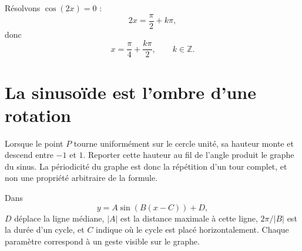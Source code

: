 \documentclass[12pt,a4paper,openany]{book}
\newcommand{\Z}{\mathbb{Z}}
\begin{document}
\begin{examplebox}
Résolvons $\cos(2x)=0$ :
\[
2x=\frac\pi2+k\pi,
\]
donc
\[
x=\frac\pi4+\frac{k\pi}{2},
\qquad k\in\Z.
\]
\end{examplebox}


\section{La sinusoïde est l'ombre d'une rotation}

\begin{visualbox}
Lorsque le point $P$ tourne uniformément sur le cercle unité, sa hauteur monte et descend entre $-1$ et $1$. Reporter cette hauteur au fil de l'angle produit le graphe du sinus. La périodicité du graphe est donc la répétition d'un tour complet, et non une propriété arbitraire de la formule.
\end{visualbox}

\begin{center}
\end{center}

\begin{connectionbox}
Dans
\[
y=A\sin(B(x-C))+D,
\]
$D$ déplace la ligne médiane, $|A|$ est la distance maximale à cette ligne, $2\pi/|B|$ est la durée d'un cycle, et $C$ indique où le cycle est placé horizontalement. Chaque paramètre correspond à un geste visible sur le graphe.
\end{connectionbox}
\end{document}

